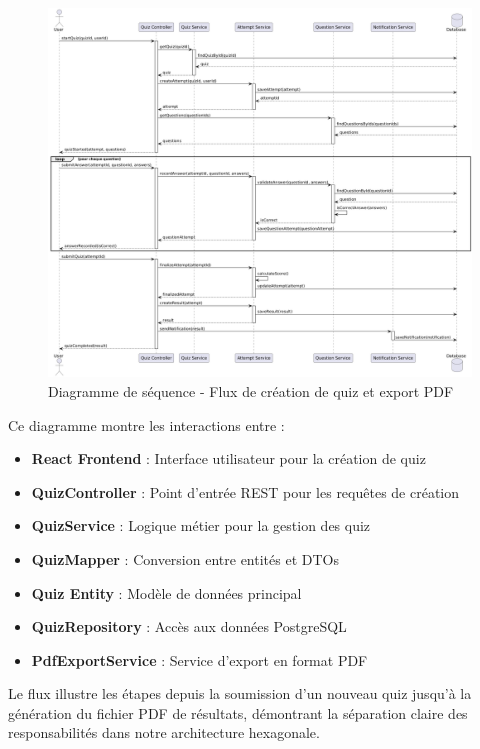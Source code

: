 \documentclass[12pt,a4paper]{report}
\begin{document}
\begin{figure}[H]
\centering
\includegraphics[width=1.0\textwidth]{latex_media/media/sequence_diagram_quiz_creation.png}
\caption{Diagramme de séquence - Flux de création de quiz et export PDF}
\label{fig:sequence-creation-quiz}
\end{figure}

Ce diagramme montre les interactions entre :
\begin{itemize}
\item \textbf{React Frontend} : Interface utilisateur pour la création de quiz
\item \textbf{QuizController} : Point d'entrée REST pour les requêtes de création
\item \textbf{QuizService} : Logique métier pour la gestion des quiz
\item \textbf{QuizMapper} : Conversion entre entités et DTOs
\item \textbf{Quiz Entity} : Modèle de données principal
\item \textbf{QuizRepository} : Accès aux données PostgreSQL
\item \textbf{PdfExportService} : Service d'export en format PDF
\end{itemize}

Le flux illustre les étapes depuis la soumission d'un nouveau quiz jusqu'à la génération du fichier PDF de résultats, démontrant la séparation claire des responsabilités dans notre architecture hexagonale.
\end{document}
